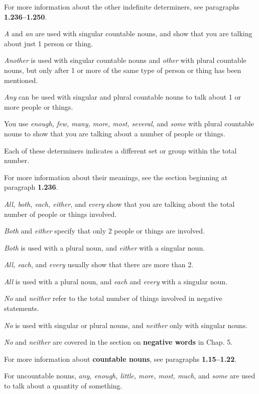 \documentclass[oneside]{book}
\numberwithin{equation}{section}
\begin{document}
%
For more information about the other indefinite determiners, see paragraphs \textbf{1.236--1.250}.

%
\noindent{} \textit{A} and \textit{an} are used with singular countable nouns, and show that you are talking about just 1 person or thing.

%
\textit{Another} is used with singular countable nouns and \textit{other} with plural countable nouns, but only after 1 or more of the same type of person or thing has been mentioned.

%
\textit{Any} can be used with singular and plural countable nouns to talk about 1 or more people or things.

You use \textit{enough, few, many, more, most, several}, and \textit{some} with plural countable nouns to show that you are talking about a number of people or things.

Each of these determiners indicates a different set or group within the total number.

For more information about their meanings, see the section beginning at paragraph \textbf{1.236}.

%
\textit{All, both, each, either}, and \textit{every} show that you are talking about the total number of people or things involved.

\textit{Both} and \textit{either} specify that only 2 people or things are involved.

\textit{Both} is used with a plural noun, and \textit{either} with a singular noun.

\textit{All, each}, and \textit{every} usually show that there are more than 2.

\textit{All} is used with a plural noun, and \textit{each} and \textit{every} with a singular noun.

%
\textit{No} and \textit{neither} refer to the total number of things involved in negative statements.

\textit{No} is used with singular or plural nouns, and \textit{neither} only with singular nouns.

\textit{No} and \textit{neither} are covered in the section on \textbf{negative words} in Chap. 5.

%
For more information about \textbf{countable nouns}, see paragraphs \textbf{1.15--1.22}.

%
\noindent{} For uncountable nouns, \textit{any, enough, little, more, most, much}, and \textit{some} are used to talk about a quantity of something.
\end{document}
